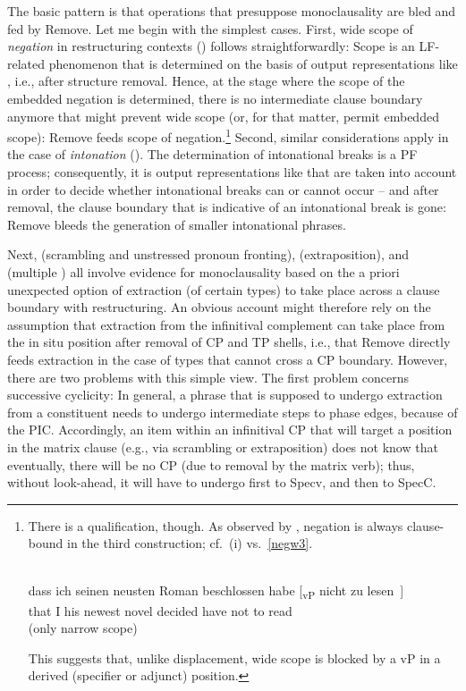 \documentclass[output=paper]{langsci/langscibook}
\begin{document}
The basic pattern is that operations that presuppose monoclausality are bled
and fed by Remove. Let me begin with the simplest cases. First, wide scope of
{\itshape negation} in restructuring contexts () follows
straightforwardly: Scope is an \gls{LF}-related phenomenon that is determined
on the basis of output representations like , i.e., after structure
removal. Hence, at the stage where the  scope of the embedded negation is
determined, there is no intermediate clause boundary anymore that might prevent
wide scope (or, for that matter, permit embedded scope):  Remove feeds scope of
negation.\footnote{There is a qualification, though. As observed by
    \cite{Santorini&Kroch:91}, negation is always clause-bound in the third
    construction; cf.\ (i) vs.\ \eqref{negw3}.

\begin{exe}
     \\
    \gll dass ich seinen neusten Roman beschlossen habe [\textsubscript{vP} nicht zu lesen~]\\
        that I his newest novel\textsubscript{\Acc} decided have {} not to read\\
    \trans (only narrow scope)
\end{exe}

This suggests that, unlike displacement, wide scope is blocked by a vP in a
derived (specifier or adjunct) position.} Second, similar considerations apply
in the case of {\itshape intonation} (). The determination of intonational
breaks is a \gls{PF} process; consequently, it is output representations like
 that are taken into account in order to decide whether
intonational breaks can or cannot occur -- and after  removal, the clause
boundary that is indicative of an intonational break is gone: Remove bleeds the
generation of smaller intonational phrases.

Next,  (scrambling and unstressed pronoun fronting), 
(extraposition), and  (multiple ) all involve evidence for
monoclausality based on the a priori unexpected option of extraction (of
certain  types) to take place across a clause boundary with
restructuring. An obvious account might therefore rely on the assumption that
extraction from the infinitival complement can take place from the in situ
position after removal of CP and TP shells, i.e., that Remove directly feeds
extraction in the case of  types that cannot cross a CP boundary.
However, there are two problems with this simple view.  The first problem
concerns successive cyclicity: In general, a phrase that is supposed to undergo
extraction from a constituent needs to undergo intermediate  steps to
phase edges, because of the \gls{PIC}. Accordingly, an item within an
infinitival CP that will target a position in the matrix clause (e.g., via
scrambling or extraposition) does not know that eventually, there will be no CP
(due to removal by the matrix verb); thus, without look-ahead, it will have to
undergo  first to Specv, and then to SpecC.
\end{document}
